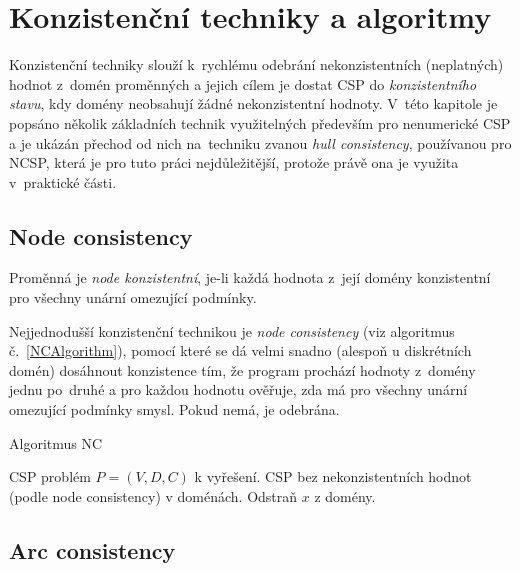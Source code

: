 \section{Konzistenční techniky a algoritmy}
Konzistenční techniky slouží k~rychlému odebrání nekonzistentních (neplatných) hodnot z~domén proměnných a jejich cílem je dostat CSP do \emph{konzistentního stavu}, kdy domény neobsahují žádné nekonzistentní hodnoty. V~této kapitole je popsáno několik základních technik využitelných především pro nenumerické CSP a je ukázán přechod od nich na~techniku zvanou \emph{hull consistency}, používanou pro NCSP, která je pro tuto práci nejdůležitější, protože právě ona je využita v~praktické části.

\subsection{Node consistency}

\begin{definition}
\label{def:nodeConsistency}
Proměnná je \emph{node konzistentní}, je-li každá hodnota z~její domény konzistentní pro všechny unární omezující podmínky.
\end{definition}

Nejjednodušší konzistenční technikou je \emph{node consistency} \cite{bartakGuide} (viz algoritmus č.~\ref{NCAlgorithm}), pomocí které se dá velmi snadno (alespoň u diskrétních domén) dosáhnout konzistence tím, že program prochází hodnoty z~domény jednu po~druhé a pro každou hodnotu ověřuje, zda má pro všechny unární omezující podmínky smysl. Pokud nemá, je odebrána.


\begin{algorithm}
\caption{Algoritmus NC}
\label{NCAlgorithm}
\begin{algorithmic}[1]
\Require CSP problém $P = (V, D, C)$ k vyřešení.
\Ensure CSP bez nekonzistentních hodnot (podle node consistency) v doménách.
\State Odstraň $x$ z domény.
\EndIf
\EndFor
\EndFor
\EndFor
\EndProcedure
\end{algorithmic}
\end{algorithm}


\subsection{Arc consistency}

